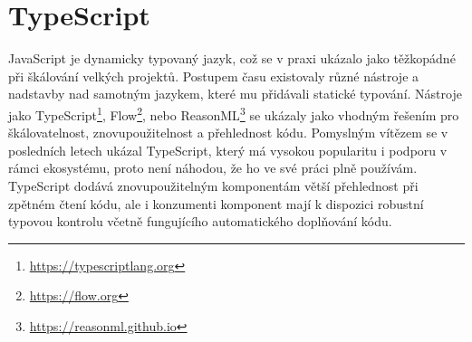 





\section{TypeScript}

JavaScript je dynamicky typovaný jazyk, což se v praxi ukázalo jako těžkopádné při škálování velkých projektů.
Postupem času existovaly různé nástroje a nadstavby nad samotným jazykem, které mu přidávali statické typování.
Nástroje jako TypeScript\footnote{\url{https://typescriptlang.org}}, Flow\footnote{\url{https://flow.org}}, nebo ReasonML\footnote{\url{https://reasonml.github.io}} se ukázaly jako vhodným řešením pro škálovatelnost, znovupoužitelnost a přehlednost kódu.
Pomyslným vítězem se v posledních letech ukázal TypeScript, který má vysokou popularitu i podporu v rámci ekosystému, proto není náhodou, že ho ve své práci plně používám.
TypeScript dodává znovupoužitelným komponentám větší přehlednost při zpětném čtení kódu, ale i konzumenti komponent mají k dispozici robustní typovou kontrolu včetně fungujícího automatického doplňování kódu.

